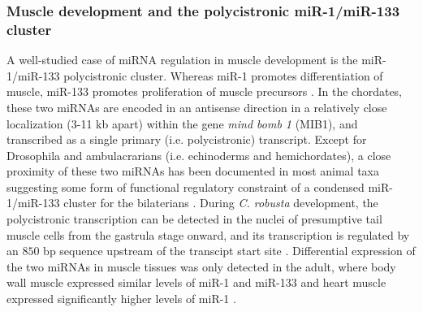 \documentclass[graybox]{svmult}
\begin{document}
\subsubsection{Muscle development and the polycistronic miR-1/miR-133 cluster}
A well-studied case of miRNA regulation in muscle development is the 
miR-1/miR-133 polycistronic cluster. Whereas miR-1 promotes differentiation of 
muscle, miR-133 promotes proliferation of muscle precursors \cite{Chen:2005yq}. 
In the chordates, these two miRNAs are encoded in an antisense direction in a 
relatively close localization (3-11 kb apart) within the gene \textit{mind bomb 
1} (MIB1), and transcribed as a single primary (i.e. polycistronic) transcript. 
Except for Drosophila and ambulacrarians (i.e. echinoderms and hemichordates), 
a close proximity of these two miRNAs has been documented in most animal taxa 
suggesting some form of functional regulatory constraint of a condensed 
miR-1/miR-133 cluster for the bilaterians \cite{Campo-Paysaa:2011}. 
During \textit{C. robusta} development, the polycistronic transcription can be 
detected in the nuclei of presumptive tail muscle cells from the gastrula stage 
onward, and its transcription is regulated by an $850$ bp sequence upstream of 
the transcipt start site \cite{Kusakabe2013}. Differential 
expression of the two miRNAs in muscle tissues was only detected in the adult, 
where body wall muscle expressed similar levels of miR-1 and miR-133 and heart 
muscle expressed significantly higher levels of miR-1 \cite{Kusakabe2013}.
\end{document}
